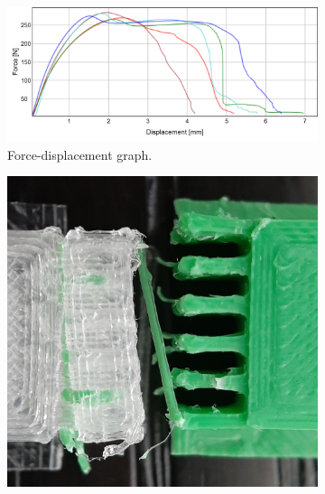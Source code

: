 \begin{figure}
	\centering
	\begin{subfigure}[B]{.69\columnwidth}
		\centering
		\includegraphics[width=\columnwidth]{sources/testing/force_displacement_J.png}
		\caption{Force-displacement graph.}
		\label{fig:force-displacement}
	\end{subfigure}
\setlength{\figwidth}{.14\columnwidth}
	\begin{subfigure}[B]{.29\columnwidth}
		\centering
		\includegraphics[width=\figwidth]{sources/testing/j1_cropped.jpg}

\end{subfigure}
\end{figure}
